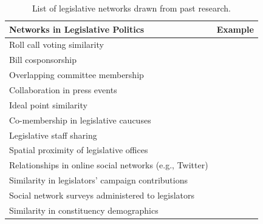 \documentclass[12pt]{article}
\begin{document}
\begin{table}[h]
\centering
\begin{tabular}{ll}
\hline \hline
 Networks in Legislative Politics & Example\\
\hline
Roll call voting similarity &\citet{kim2012comparing}  \\
Bill cosponsorship & \citet{fowler2006connecting} \\
Overlapping committee membership &\citet{porter2005network} \\
Collaboration in press events & \citet{desmarais2015measuring} \\
Ideal point similarity & \citet{coppock2014information}  \\
Co-membership in legislative caucuses & \citet{victor2009social} \\
Legislative staff sharing &  \citet{ringe2013keeping} \\
Spatial proximity of legislative offices & \citet{rogowski2012estimating} \\
Relationships in online social networks (e.g., Twitter) & \citet{peng2016follower}  \\
Similarity in legislators' campaign contributions & \citet{masket2015polarization} \\
Social network surveys administered to legislators & \citet{wojcik2017legislative} \\
Similarity in constituency demographics & \citet{bratton2011networks} \\
\hline \hline
\end{tabular}

\caption{List of legislative networks drawn from past research.}
\label{tab:legislative.nets}
\end{table}
\end{document}
